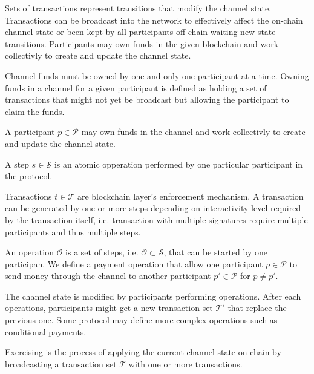 \documentclass{llncs}
\begin{document}
Sets of transactions represent transitions that modify the channel state. Transactions can be broadcast into the network to effectively affect the on-chain channel state or been kept by all participants off-chain waiting new state transitions. Participants may own funds in the given blockchain and work collectivly to create and update the channel state.

Channel funds must be owned by one and only one participant at a time. Owning funds in a channel for a given participant is defined as holding a set of transactions that might not yet be broadcast but allowing the participant to claim the funds.

\begin{definition}[Participant] A participant $p \in \mathcal{P}$ may own funds in the channel and work collectivly to create and update the channel state.
\end{definition}

\begin{definition}[Step] A step $s \in \mathcal{S}$ is an atomic opperation performed by one particular participant in the protocol.
\end{definition}

\begin{definition}[Transaction] Transactions $t \in \mathcal{T}$ are blockchain layer's enforcement mechanism. A transaction can be generated by one or more steps depending on interactivity level required by the transaction itself, i.e. transaction with multiple signatures require multiple participants and thus multiple steps.
\end{definition}

\begin{definition}[Operation] An operation $\mathcal{O}$ is a set of steps, i.e. $\mathcal{O} \subset \mathcal{S}$, that can be started by one participan. We define a payment operation that allow one participant $p \in \mathcal{P}$ to send money through the channel to another participant $p' \in \mathcal{P}$ for $p \neq p'$.
\end{definition}

The channel state is modified by participants performing operations. After each operations, participants might get a new transaction set $\mathcal{T'}$ that replace the previous one. Some protocol may define more complex operations such as conditional payments.

\begin{definition}[Exercise] Exercising is the process of applying the current channel state on-chain by broadcasting a transaction set $\mathcal{T}$ with one or more transactions.
\end{definition}
\end{document}
